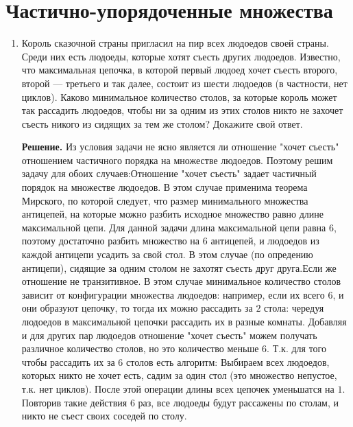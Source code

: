 \documentclass[fleqn]{article}
\begin{document}
		\section{Частично-упорядоченные множества}
		\begin{enumerate}
		\item Король сказочной страны пригласил на пир всех людоедов своей страны. Среди них есть людоеды, которые хотят съесть других людоедов. Известно, что максимальная цепочка, в которой первый людоед хочет съесть второго, второй — третьего и так далее, состоит из шести людоедов (в частности, нет циклов). Каково минимальное количество столов, за которые король может так рассадить людоедов, чтобы ни за одним из этих столов никто не захочет съесть никого из сидящих за тем же столом? Докажите свой ответ.
		
		\textbf{Решение.} Из условия задачи не ясно является ли отношение "хочет съесть" отношением частичного порядка на множестве людоедов. Поэтому решим задачу для обоих случаев:Отношение "хочет съесть" задает частичный порядок на множестве людоедов. В этом случае применима теорема Мирского, по которой следует, что размер минимального множества антицепей, на которые можно разбить исходное множество равно длине максимальной цепи. Для данной задачи длина максимальной цепи равна $6$, поэтому достаточно разбить множество на $6$ антицепей, и людоедов из каждой антицепи усадить за свой стол. В этом случае (по опредению антицепи), сидящие за одним столом не захотят съесть друг друга.Если же отношение не транзитивное. В этом случае минимальное количество столов зависит от конфигурации множества людоедов: например, если их всего $6$, и они образуют цепочку, то тогда их можно рассадить за $2$ стола: чередуя людоедов в максимальной цепочки рассадить их в разные комнаты. Добавляя и для других пар людоедов отношение "хочет съесть" можем получать различное количество столов, но это количество меньше $6$. Т.к. для того чтобы рассадить их за 6 столов есть алгоритм: Выбираем всех людоедов, которых никто не хочет есть, садим за один стол (это множество непустое, т.к. нет циклов). После этой операции длины всех цепочек уменьшатся на $1$. Повторив такие действия 6 раз, все людоеды будут рассажены по столам, и никто не съест своих соседей по столу.
	\end{enumerate}
\end{document}
